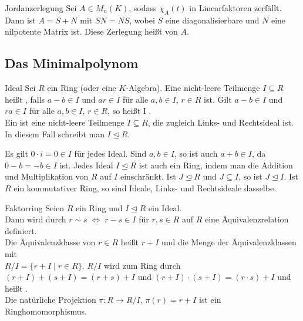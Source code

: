\begin{Satz}{Jordanzerlegung}
    Sei $A \in M_n(K)$, sodass $\chi_A(t)$ in Linearfaktoren zerfällt. \\
    Dann ist $A = S + N$ mit $SN = NS$, wobei $S$ eine diagonalisierbare
    und $N$ eine nilpotente Matrix ist.
    Diese Zerlegung heißt  von $A$.
\end{Satz}

\subsection{%
    Das Minimalpolynom%
}

\begin{Def}{Ideal}
    Sei $R$ ein Ring (oder eine $K$-Algebra).
    Eine nicht-leere Teilmenge $I \subseteq R$ heißt ,
    falls $a - b \in I$ und $ar \in I$ für alle $a, b \in I$, $r \in R$ ist.
    Gilt $a - b \in I$ und $ra \in I$ für alle $a, b \in I$, $r \in R$,
    so heißt I . \\
    Ein  ist eine nicht-leere Teilmenge
    $I \subseteq R$, die zugleich Links- und Rechtsideal ist.
    In diesem Fall schreibt man $I \trianglelefteq R$.
\end{Def}

\begin{Bem}
    Es gilt $0 \cdot i = 0 \in I$ für jedes Ideal.
    Sind $a, b \in I$, so ist auch $a + b \in I$, da $0 - b = -b \in I$ ist.
    Jedes Ideal $I \trianglelefteq R$ ist auch ein Ring, indem man die
    Addition und Multiplikation von $R$ auf $I$ einschränkt.
    Ist $J \trianglelefteq R$ und $J \subseteq I$, so ist
    $J \trianglelefteq I$.
    Ist $R$ ein kommutativer Ring, so sind Ideale, Links- und Rechtsideale
    dasselbe.
\end{Bem}

\begin{Def}{Faktorring}
    Seien $R$ ein Ring und $I \trianglelefteq R$ ein Ideal. \\
    Dann wird durch $r \sim s \;\Leftrightarrow\; r - s \in I$
    für $r, s \in R$ auf $R$ eine Äquivalenzrelation definiert. \\
    Die Äquivalenzklasse von $r \in R$ heißt $r + I$ und
    die Menge der Äquivalenzklassen mit \\
    $R/I = \{r + I \;|\; r \in R\}$.
    $R/I$ wird zum Ring durch
    $(r + I) + (s + I) = (r + s) + I$ und
    $(r + I) \cdot (s + I) = (r \cdot s) + I$
    und heißt . \\
    Die natürliche Projektion $\pi: R \rightarrow R/I$, $\pi(r) = r + I$
    ist ein Ringhomomorphismus.
\end{Def}

